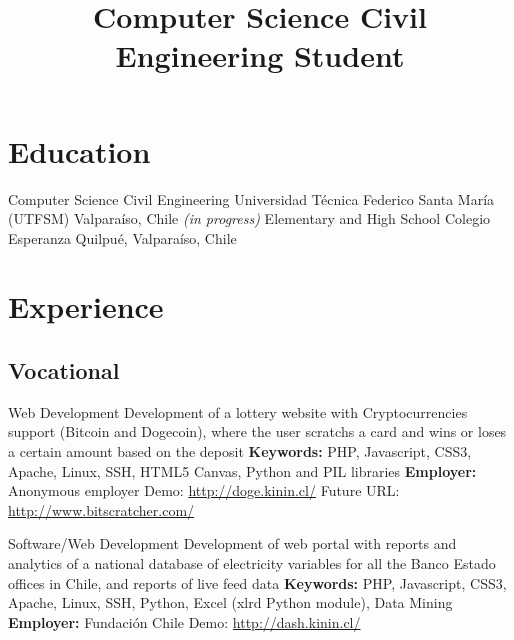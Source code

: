 \documentclass[11pt,a4paper,sans]{moderncv}
\title{Computer Science Civil Engineering Student}
\begin{document}
\maketitle



	   
\section{Education}

        {Computer Science Civil Engineering}
        {Universidad Técnica Federico Santa María (UTFSM)}
        {Valparaíso, Chile}
        {\emph{(in progress)}}
        {}
        {Elementary and High School}
        {Colegio Esperanza}
        {Quilpué, Valparaíso, Chile}
        {}{}

\section{Experience}
\subsection{Vocational}

        {Web Development}
        {Development of a lottery website with Cryptocurrencies support (Bitcoin and Dogecoin), where the user scratchs a card and wins or loses a certain amount based on the deposit}
        {\textbf{Keywords:} PHP, Javascript, CSS3, Apache, Linux, SSH, HTML5 Canvas, Python and PIL libraries}
        {\textbf{Employer:} Anonymous employer}
        {Demo: \url{http://doge.kinin.cl/} Future URL: \url{http://www.bitscratcher.com/}}

        {Software/Web Development}
        {Development of web portal with reports and analytics of a national database of electricity variables for all the Banco Estado offices in Chile, and reports of live feed data}
        {\textbf{Keywords:} PHP, Javascript, CSS3, Apache, Linux, SSH, Python, Excel (xlrd Python module), Data Mining}
        {\textbf{Employer:} Fundación Chile}
        {Demo: \url{http://dash.kinin.cl/}}
\end{document}
